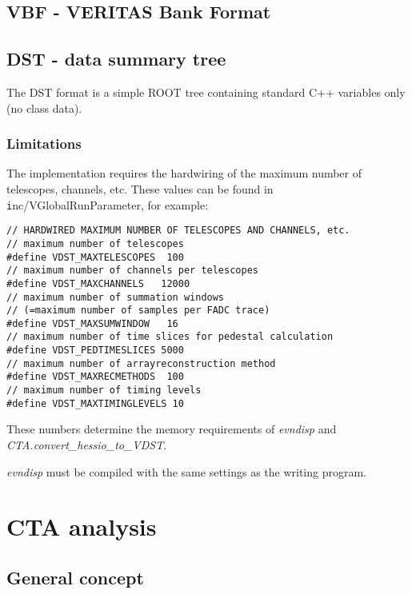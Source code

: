 \documentclass[titlepage,a4paper,twoside,11pt]{report}
\begin{document}
\section{VBF - VERITAS Bank Format}

\section{DST - data summary tree}

The DST format is a simple ROOT tree containing standard C++ variables only (no class data).

\subsection{Limitations}

The implementation requires the hardwiring of the maximum number of telescopes, channels, etc. 
These values can be found in {\texttt inc/VGlobalRunParameter}, for example:

\begin{lstlisting}
// HARDWIRED MAXIMUM NUMBER OF TELESCOPES AND CHANNELS, etc.
// maximum number of telescopes
#define VDST_MAXTELESCOPES  100
// maximum number of channels per telescopes
#define VDST_MAXCHANNELS   12000
// maximum number of summation windows
// (=maximum number of samples per FADC trace)   
#define VDST_MAXSUMWINDOW   16
// maximum number of time slices for pedestal calculation
#define VDST_PEDTIMESLICES 5000   
// maximum number of arrayreconstruction method 
#define VDST_MAXRECMETHODS  100
// maximum number of timing levels
#define VDST_MAXTIMINGLEVELS 10    
\end{lstlisting}

 These numbers determine the memory requirements of {\it evndisp} and {\it CTA.convert\_hessio\_to\_VDST}.

 {\it evndisp} must be compiled with the same settings as the writing program.


\chapter{CTA analysis}

\section{General concept}
\end{document}
